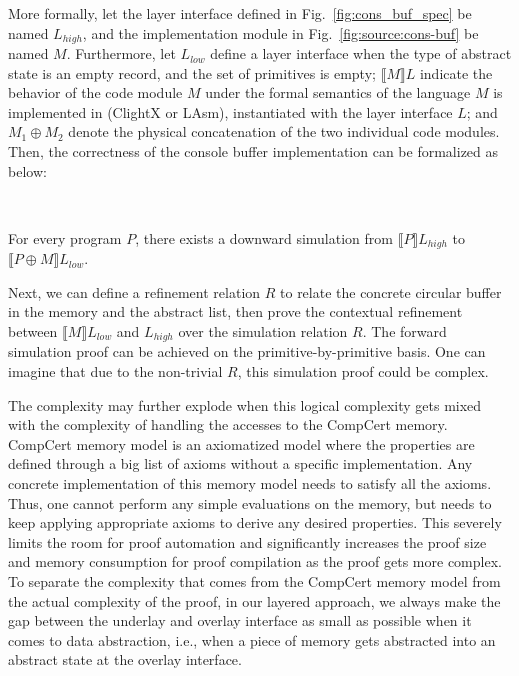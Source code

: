 More formally, let the layer interface defined
in Fig.~\ref{fig:cons_buf_spec} be named $L_{high}$, and the implementation
module in Fig.~\ref{fig:source:cons-buf} be named $M$.
Furthermore, let 
$L_{low}$ define a layer interface when the type of abstract state
is an empty record, and the set of primitives is empty;
$\llbracket{}M\rrbracket{}L$ indicate the behavior of the code module $M$
under the formal semantics of the language $M$ is implemented in (ClightX or LAsm),
instantiated with the layer interface $L$; and $M_1 \oplus M_2$ denote the physical
concatenation of the two individual code modules. Then, the correctness of
the console buffer implementation can be formalized as below:

\begin{lemma}
$ $

For every program $P$, there exists a downward simulation from
$\llbracket{}P\rrbracket{}L_{high}$
to $\llbracket{}{P \oplus M}\rrbracket{}L_{low}$.
\end{lemma}

Next, we can define a refinement relation $R$ to relate the concrete circular
buffer in the memory and the abstract list, then prove the contextual refinement
between $\llbracket{}M\rrbracket{}L_{low}$ and $L_{high}$ over the simulation
relation $R$. The forward simulation proof can be achieved on the
primitive-by-primitive basis. One can imagine that due to the non-trivial $R$,
this simulation proof could be complex.

The complexity may further explode when this logical complexity gets mixed with
the complexity of handling the accesses to the CompCert memory. CompCert memory
model is an axiomatized model where the properties are defined through a big
list of axioms without a specific implementation. Any concrete implementation of
this memory model needs to satisfy all the axioms. Thus, one cannot perform any
simple evaluations on the memory, but needs to keep applying appropriate axioms
to derive any desired properties. This severely limits the room for proof
automation and significantly increases the proof size and memory consumption for
proof compilation as the proof gets more complex. To separate the complexity
that comes from the CompCert memory model from the actual complexity of the
proof, in our layered approach, we always make the gap between the underlay and
overlay interface as small as possible when it comes to data abstraction, i.e.,
when a piece of memory gets abstracted into an abstract state at the overlay
interface.

